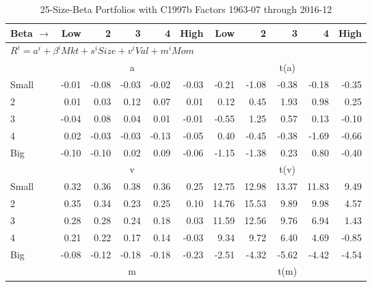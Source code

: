 
\begin{table}[!ht]
\centering
\caption{25-Size-Beta Portfolios with C1997b Factors 1963-07 through 2016-12}
\begin{tabular}{lrrrrrrrrrr}
  \toprule
    Beta $\rightarrow$ & Low & 2 & 3 & 4 & High & Low & 2 & 3 & 4 & High \\ 
  \midrule
  \multicolumn{11}{l}{$R^i=a^i+\beta^iMkt+s^iSize+v^iVal+m^iMom$} \\

  
    
      & \multicolumn{5}{c}{a} & \multicolumn{5}{c}{t(a)}
    
    \\
      \cmidrule(r){2-6} \cmidrule(r){7-11}

    Small   & -0.01  & -0.08  & -0.03  & -0.02  & -0.03  & -0.21  & -1.08  & -0.38  & -0.18  & -0.35  \\
         2  & 0.01  & 0.03  & 0.12  & 0.07  & 0.01  & 0.12  & 0.45  & 1.93  & 0.98  & 0.25  \\
         3  & -0.04  & 0.08  & 0.04  & 0.01  & -0.01  & -0.55  & 1.25  & 0.57  & 0.13  & -0.10  \\
         4  & 0.02  & -0.03  & -0.03  & -0.13  & -0.05  & 0.40  & -0.45  & -0.38  & -1.69  & -0.66  \\
    Big     & -0.10  & -0.10  & 0.02  & 0.09  & -0.06  & -1.15  & -1.38  & 0.23  & 0.80  & -0.40  \\

  
    
      & \multicolumn{5}{c}{v} & \multicolumn{5}{c}{t(v)}
    
    \\
      \cmidrule(r){2-6} \cmidrule(r){7-11}

    Small   & 0.32  & 0.36  & 0.38  & 0.36  & 0.25  & 12.75  & 12.98  & 13.37  & 11.83  & 9.49  \\
         2  & 0.35  & 0.34  & 0.23  & 0.25  & 0.10  & 14.76  & 15.53  & 9.89  & 9.98  & 4.57  \\
         3  & 0.28  & 0.28  & 0.24  & 0.18  & 0.03  & 11.59  & 12.56  & 9.76  & 6.94  & 1.43  \\
         4  & 0.21  & 0.22  & 0.17  & 0.14  & -0.03  & 9.34  & 9.72  & 6.40  & 4.69  & -0.85  \\
    Big     & -0.08  & -0.12  & -0.18  & -0.18  & -0.23  & -2.51  & -4.32  & -5.62  & -4.42  & -4.54  \\

  
    
      & \multicolumn{5}{c}{m} & \multicolumn{5}{c}{t(m)}
    

\end{tabular}
\end{table}
